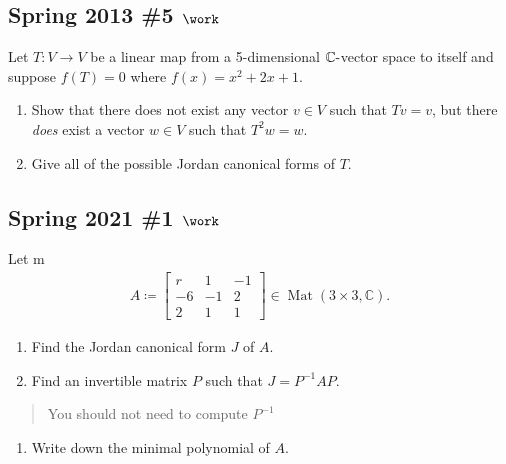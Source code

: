 \hypertarget{spring-2013-5-work}{%
\subsection{\texorpdfstring{Spring 2013 \#5
\(\work\)}{Spring 2013 \#5 \textbackslash work}}\label{spring-2013-5-work}}

Let \(T: V\to V\) be a linear map from a 5-dimensional
\({\mathbb{C}}{\hbox{-}}\)vector space to itself and suppose
\(f(T) = 0\) where \(f(x) = x^2 + 2x + 1\).

\begin{enumerate}
\def\labelenumi{\alph{enumi}.}
\item
  Show that there does not exist any vector \(v\in V\) such that
  \(Tv = v\), but there \emph{does} exist a vector \(w\in V\) such that
  \(T^2 w= w\).
\item
  Give all of the possible Jordan canonical forms of \(T\).
\end{enumerate}

\hypertarget{spring-2021-1-work}{%
\subsection{\texorpdfstring{Spring 2021 \#1
\(\work\)}{Spring 2021 \#1 \textbackslash work}}\label{spring-2021-1-work}}

Let m
\begin{align*}
A \coloneqq
\begin{bmatrix}
r & 1 & -1 \\
-6 & -1 & 2 \\
2 & 1 & 1
\end{bmatrix}
\in \operatorname{Mat}(3\times 3, {\mathbb{C}})
.\end{align*}

\begin{enumerate}
\def\labelenumi{\alph{enumi}.}
\item
  Find the Jordan canonical form \(J\) of \(A\).
\item
  Find an invertible matrix \(P\) such that \(J = P ^{-1}A P\).
\end{enumerate}

\begin{quote}
You should not need to compute \(P^{-1}\)
\end{quote}

\begin{enumerate}
\def\labelenumi{\alph{enumi}.}
\setcounter{enumi}{2}
\tightlist
\item
  Write down the minimal polynomial of \(A\).
\end{enumerate}

